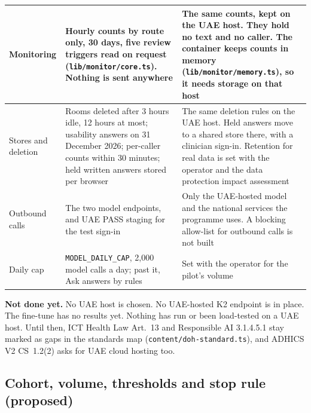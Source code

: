 \documentclass[10.5pt,a4paper]{article}
\newcommand{\code}[1]{\texttt{\small #1}}
\newcommand{\file}[1]{\leavevmode\textcolor{muted}{\texttt{\small #1}}}
\begin{document}
{\begin{xltabular}{\textwidth}{@{}P{2.4cm}LL@{}}
\midrule
Monitoring & Hourly counts by route only, 30 days, five review triggers read on request (\file{lib/monitor/core.ts}). Nothing is sent anywhere & The same counts, kept on the UAE host. They hold no text and no caller. The container keeps counts in memory (\file{lib/monitor/memory.ts}), so it needs storage on that host\\
\midrule
Stores and deletion & Rooms deleted after 3 hours idle, 12 hours at most; usability answers on 31 December 2026; per-caller counts within 30 minutes; held written answers stored per browser & The same deletion rules on the UAE host. Held answers move to a shared store there, with a clinician sign-in. Retention for real data is set with the operator and the data protection impact assessment\\
\midrule
Outbound calls & The two model endpoints, and UAE PASS staging for the test sign-in & Only the UAE-hosted model and the national services the programme uses. A blocking allow-list for outbound calls is not built\\
\midrule
Daily cap & \code{MODEL\_DAILY\_CAP}, 2,000 model calls a day; past it, Ask answers by rules & Set with the operator for the pilot's volume\\
\bottomrule
\end{xltabular}}

\textbf{Not done yet.} No UAE host is chosen. No UAE-hosted K2 endpoint is in place. The fine-tune has no results yet.
Nothing has run or been load-tested on a UAE host. Until then, ICT Health Law Art.~13 and Responsible AI 3.1.4.5.1 stay
marked as gaps in the standards map (\file{content/doh-standard.ts}), and ADHICS V2 CS~1.2(2) asks for UAE cloud
hosting too.

\subsection{Cohort, volume, thresholds and stop rule (proposed)}
\end{document}
